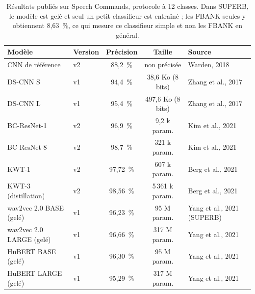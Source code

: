 \begin{table}[ht]
  \centering\footnotesize
  \begin{tabular}{llccl}
    \toprule
    Modèle & Version & Précision & Taille & Source\\
    \midrule
    CNN de référence & v2 & 88,2~\% & non précisée & Warden, 2018\\
    DS-CNN S & v1 & 94,4~\% & 38,6 Ko (8 bits) & Zhang et al., 2017\\
    DS-CNN L & v1 & 95,4~\% & 497,6 Ko (8 bits) & Zhang et al., 2017\\
    BC-ResNet-1 & v2 & 96,9~\% & 9,2 k param. & Kim et al., 2021\\
    BC-ResNet-8 & v2 & 98,7~\% & 321 k param. & Kim et al., 2021\\
    KWT-1 & v2 & 97,72~\% & 607 k param. & Berg et al., 2021\\
    KWT-3 (distillation) & v2 & 98,56~\% & 5\,361 k param. & Berg et al., 2021\\
    wav2vec 2.0 BASE (gelé) & v1 & 96,23~\% & 95 M param. & Yang et al., 2021 (SUPERB)\\
    wav2vec 2.0 LARGE (gelé) & v1 & 96,66~\% & 317 M param. & Yang et al., 2021\\
    HuBERT BASE (gelé) & v1 & 96,30~\% & 95 M param. & Yang et al., 2021\\
    HuBERT LARGE (gelé) & v1 & 95,29~\% & 317 M param. & Yang et al., 2021\\
    \bottomrule
  \end{tabular}
  \caption{Résultats publiés sur Speech Commands, protocole à 12 classes. Dans SUPERB, le modèle est gelé et seul un petit classifieur est entraîné ; les FBANK seules y obtiennent 8,63~\%, ce qui mesure ce classifieur simple et non les FBANK en général.}
  \label{tab:sc}
\end{table}


